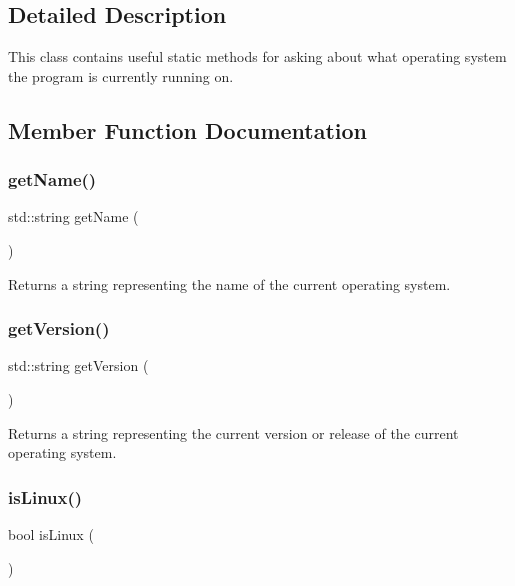 \subsection{Detailed Description}
This class contains useful static methods for asking about what operating system the program is currently running on. 

\subsection{Member Function Documentation}
\mbox{\label{classOS_ac0fc966d4386ddb71d99361e3fccb311}} 
\subsubsection{\texorpdfstring{get\+Name()}{getName()}}
{\footnotesize\ttfamily std\+::string get\+Name (\begin{DoxyParamCaption}{ }\end{DoxyParamCaption})\hspace{0.3cm}{\ttfamily [static]}}



Returns a string representing the name of the current operating system. 

\mbox{\label{classOS_aee3bd62c6c84d746802c115f5d4c1519}} 
\subsubsection{\texorpdfstring{get\+Version()}{getVersion()}}
{\footnotesize\ttfamily std\+::string get\+Version (\begin{DoxyParamCaption}{ }\end{DoxyParamCaption})\hspace{0.3cm}{\ttfamily [static]}}



Returns a string representing the current version or release of the current operating system. 

\mbox{\label{classOS_a788e423282dd2f38315986d30bbae63b}} 
\subsubsection{\texorpdfstring{is\+Linux()}{isLinux()}}
{\footnotesize\ttfamily bool is\+Linux (\begin{DoxyParamCaption}{ }\end{DoxyParamCaption})\hspace{0.3cm}{\ttfamily [static]}}



